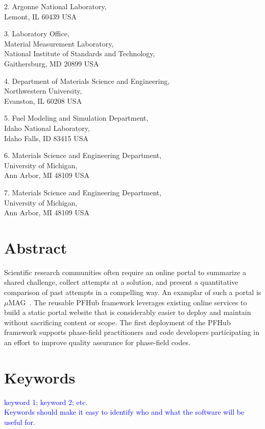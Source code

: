 \documentclass{jors}
\begin{document}
2. Argonne National Laboratory, \\
Lemont, IL 60439 USA

3. Laboratory Office, \\
Material Measurement Laboratory, \\
National Institute of Standards and Technology, \\
Gaithersburg, MD 20899 USA

4. Department of Materials Science and Engineering, \\
Northwestern University, \\
Evanston, IL 60208 USA

5. Fuel Modeling and Simulation Department, \\
Idaho National Laboratory, \\
Idaho Falls, ID 83415 USA

6. Materials Science and Engineering Department, \\
University of Michigan, \\
Ann Arbor, MI 48109 USA

7. Materials Science and Engineering Department, \\
University of Michigan, \\
Ann Arbor, MI 48109 USA

\section*{Abstract}

Scientific research communities often require an online portal to
summarize a shared challenge, collect attempts at a solution, and
present a quantitative comparison of past attempts in a compelling
way. An examplar of such a portal is $\mu$MAG~\cite{mumag}. The
reusable PFHub framework leverages existing online services to build a
static portal website that is considerably easier to deploy and
maintain without sacrificing content or scope. The first deployment of
the PFHub framework supports phase-field practitioners and code
developers participating in an effort to improve quality assurance for
phase-field codes.

\section*{Keywords}

\textcolor{blue}{keyword 1; keyword 2; etc. \\
Keywords should make it easy to identify who and what the software will be useful for.}
\end{document}
